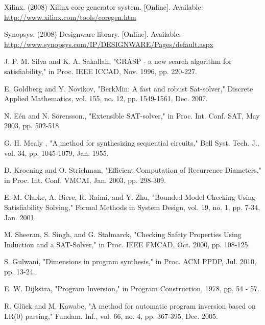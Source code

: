 \documentclass[journal]{IEEEtran}
\begin{document}
{\begin{thebibliography}{1}
Xilinx. (2008) Xilinx core generator system. [Online]. Available:
  \url{http://www.xilinx.com/tools/coregen.htm}


Synopsys. (2008) Designware library. [Online]. Available:
  \url{http://www.synopsys.com/IP/DESIGNWARE/Pages/default.aspx}


J. P. M. Silva and K. A. Sakallah,
"GRASP - a new search algorithm for satisfiability,"
in Proc. IEEE ICCAD, Nov. 1996, pp. 220-227.


E. Goldberg and Y. Novikov,
"BerkMin: A fast and robust Sat-solver,"
Discrete Applied Mathematics,
vol. 155, no. 12,
pp. 1549-1561, Dec. 2007.

N. E\'en and N. S\"orensson.,
"Extensible SAT-solver,"
in Proc. Int. Conf.
SAT, May 2003, pp. 502-518.

G. H. Mealy , "A method for synthesizing sequential circuits," Bell Syst.
Tech. J., vol. 34, pp. 1045-1079, Jan. 1955.


D. Kroening and O. Strichman,
"Efficient Computation of Recurrence Diameters,"
in Proc. Int. Conf. VMCAI, Jan. 2003,
pp. 298-309.



%




E. M. Clarke, A. Biere, R. Raimi, and Y. Zhu,
"Bounded Model Checking Using Satisfiability Solving,"
Formal Methods in System Design,
vol. 19, no. 1,
pp. 7-34, Jan. 2001.



M. Sheeran, S. Singh, and G. Stalmarck,
"Checking Safety Properties Using Induction and a SAT-Solver,"
in Proc. IEEE FMCAD, Oct. 2000, pp. 108-125.





S. Gulwani,
"Dimensions in program synthesis,"
in Proc. ACM PPDP, Jul. 2010, pp. 13-24.



E. W. Dijkstra,
"Program Inversion,"
in Program Construction,
1978,
pp. 54 - 57.


R. Gl\"{u}ck and M. Kawabe,
"A method for automatic program inversion based on LR(0) parsing,"
Fundam. Inf.,
vol. 66, no. 4,
pp. 367-395, Dec. 2005.



\end{thebibliography}}
\end{document}
